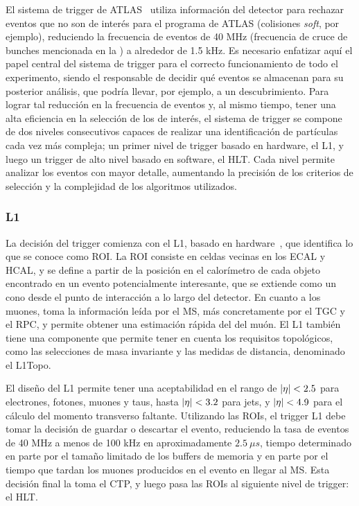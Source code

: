 El sistema de trigger de \ac{ATLAS}~\cite{ATLAS-Trigger-Performance-2010,ATLAS-Trigger-Performance-2015,ATLAS-Trigger-Performance-Run2} utiliza información del detector para rechazar eventos que no son de inter\'es para el programa de \ac{ATLAS} (colisiones \textit{soft}, por ejemplo), reduciendo la frecuencia de eventos de 40 MHz (frecuencia de cruce de bunches mencionada en la \Sect{\ref{sec:atlas:LHC}}) a alrededor de 1.5 kHz. Es necesario enfatizar aquí el papel central del sistema de trigger para el correcto funcionamiento de todo el experimento, siendo el responsable de decidir qué eventos se almacenan para su posterior an\'alisis, que podr\'ia llevar, por ejemplo, a un descubrimiento. Para lograr tal reducción en la frecuencia de eventos y, al mismo tiempo, tener una alta eficiencia en la selección de los de interés, el sistema de trigger se compone de dos niveles consecutivos capaces de realizar una identificación de partículas cada vez más compleja; un primer nivel de trigger basado en hardware, el \acf{L1}, y luego un trigger de alto nivel basado en software, el \acf{HLT}. Cada nivel permite analizar los eventos con mayor detalle, aumentando la precisión de los criterios de selección y la complejidad de los algoritmos utilizados.


\subsubsection{\acf{L1}}

La decisión del trigger comienza con el \ac{L1}, basado en hardware~\cite{ATLAS-L1Trigger}, que identifica lo que se conoce como \ac{ROI}. La \ac{ROI} consiste en celdas vecinas en los \ac{ECAL} y \ac{HCAL}, y se define a partir de la posición en el calorímetro de cada objeto encontrado en un evento potencialmente interesante, que se extiende como un cono desde el punto de interacción a lo largo del detector.
En cuanto a los muones, toma la información leída por el \ac{MS}, más concretamente por el \ac{TGC} y el \ac{RPC}, y permite obtener una estimación rápida del \pt del muón.
El \ac{L1} también tiene una componente que permite tener en cuenta los requisitos topológicos, como las selecciones de masa invariante y las medidas de distancia, denominado el \ac{L1Topo}.

El diseño del \ac{L1} permite tener una aceptabilidad en el rango de \(|\eta|<2.5\) para electrones, fotones, muones y taus, hasta \(|\eta|<3.2\) para jets, y \(|\eta|<4.9\) para el cálculo del momento transverso faltante.
Utilizando las \acp{ROI}, el trigger \ac{L1} debe tomar la decisión de guardar o descartar el evento, reduciendo la tasa de eventos de 40 MHz a menos de 100 kHz en aproximadamente \(2.5~\mu s\), tiempo determinado en parte por el tamaño limitado de los buffers de memoria y en parte por el tiempo que tardan los muones producidos en el evento en llegar al \ac{MS}. Esta decisión final la toma el \ac{CTP}, y luego pasa las \acp{ROI} al siguiente nivel de trigger: el \ac{HLT}.




